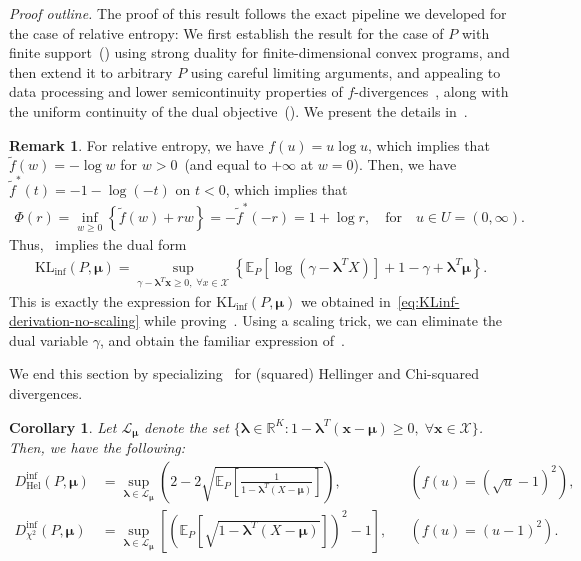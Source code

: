 \documentclass{article}
\theoremstyle{plain}
\newtheorem{corollary}[corollary]{Corollary}
\theoremstyle{definition}
\newtheorem{remark}[remark]{Remark}
\newcommand{\lrp}[1]{\left( #1 \right)}
\newcommand{\KLinf}{\operatorname{KL_{inf}}}
\newcommand{\R}{\mathbb{R}}
\newcommand{\calX}{\mathcal X}
\newcommand{\calL}{\mathcal L}
\newcommand{\xvec}{\mathbf{x}}
\newcommand{\qtext}[1]{\quad \text{#1} \quad}
\newcommand{\boldlambda}{\boldsymbol{\lambda}}
\newcommand{\boldmu}{\boldsymbol{\mu}}
\newcommand{\dualdomain}{\calL_{\boldmu}}
\newcommand{\ftilde}{\widetilde{f}}
\begin{document}
    \emph{Proof outline.}
        The proof of this result follows the exact pipeline we developed for the case of relative entropy: We first establish the result for the case of $P$ with finite support~() using strong duality for finite-dimensional convex programs, and then extend it to arbitrary $P$ using careful limiting arguments, and appealing to data processing and lower semicontinuity properties of $f$-divergences~\citep[Chapter 7]{polyanskiy2025information}, along with the uniform continuity of the dual objective~(). We present the details in~. \hfill \qedsymbol

    \begin{remark}
        \label{remark:sanity-check-KL} For relative entropy, we have $f(u) = u \log u$, which implies that $\ftilde(w) = -\log w$ for $w>0$~(and equal to $+\infty$ at $w=0$). Then, we have $\ftilde^{*}(t) = - 1 - \log(-t)$ on $t<0$, which implies that 
        \begin{align}
            \Phi(r) = \inf_{w \geq 0} \left\{ \ftilde(w) + rw \right\} = - \ftilde^{*}(-r) = 1 + \log r, \qtext{for} u \in U = (0, \infty). 
        \end{align}
        Thus,~ implies the dual form 
        \begin{align}
            \KLinf(P, \boldmu) = \sup_{\gamma - \boldlambda^T \xvec \geq 0, \; \forall x\in \calX} \left\{\mathbb{E}_P[\log(\gamma - \boldlambda^TX)] + 1 - \gamma + \boldlambda^T \boldmu \right\}. 
        \end{align}
        This is exactly the expression for $\KLinf(P, \boldmu)$ we obtained in~\eqref{eq:KLinf-derivation-no-scaling} while proving~.  Using a scaling trick, we can eliminate the dual variable $\gamma$, and obtain the familiar expression of~. 
    \end{remark}
    We end this section by specializing~ for (squared) Hellinger and Chi-squared divergences.
    \begin{corollary}
        \label{corollary:f-divergence} Let $\dualdomain$ denote the set $\{\boldlambda \in \R^K: 1 - \boldlambda^T(\xvec - \boldmu) \geq  0, \; \forall \xvec \in \calX\}$. Then, we have the following: 
        \begin{align}
            D_{\mathrm{Hel}}^{\inf}(P, \boldmu) &= \sup_{\boldlambda \in \dualdomain} \left(2 - 2 \sqrt{\mathbb{E}_P\left[ \frac{1}{1 - \boldlambda^T(X-\boldmu)} \right]}  \right), && \left( f(u) = (\sqrt{u}-1)^2 \right), \\
            D_{\chi^2}^{\inf}(P, \boldmu)&= \sup_{\boldlambda \in \dualdomain}\left[ \lrp{\mathbb{E}_P\left[\sqrt{1-\boldlambda^T(X-\boldmu)}\right]}^2 - 1 \right],  && \left( f(u) = (u-1)^2 \right).
        \end{align}
    \end{corollary}
\end{document}
